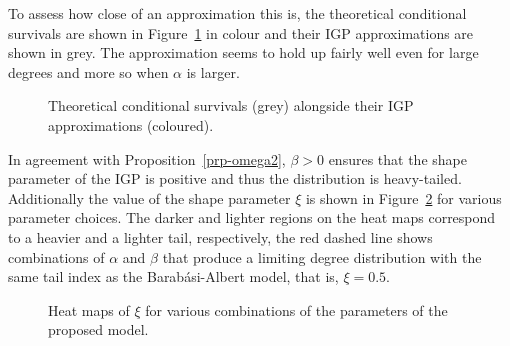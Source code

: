 \documentclass[
  sn-basic,
]{sn-jnl}
\theoremstyle{plain}
\theoremstyle{plain}
\theoremstyle{remark}
\begin{document}
To assess how close of an approximation this is, the theoretical
conditional survivals are shown in Figure~\ref{fig-approx_surv} in
colour and their IGP approximations are shown in grey. The approximation
seems to hold up fairly well even for large degrees and more so when
\(\alpha\) is larger.

\begin{figure}


\caption{\label{fig-approx_surv}Theoretical conditional survivals (grey)
alongside their IGP approximations (coloured).}

\end{figure}%

In agreement with Proposition~\ref{prp-omega2}, \(\beta>0\) ensures that
the shape parameter of the IGP is positive and thus the distribution is
heavy-tailed. Additionally the value of the shape parameter \(\xi\) is
shown in Figure~\ref{fig-polyheat} for various parameter choices. The
darker and lighter regions on the heat maps correspond to a heavier and
a lighter tail, respectively, the red dashed line shows combinations of
\(\alpha\) and \(\beta\) that produce a limiting degree distribution
with the same tail index as the Barabási-Albert model, that is,
\(\xi=0.5\).

\begin{figure}


\caption{\label{fig-polyheat}Heat maps of \(\xi\) for various
combinations of the parameters of the proposed model.}

\end{figure}%
\end{document}
